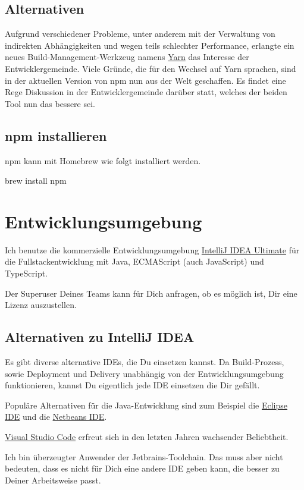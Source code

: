 \documentclass[]{article}
\begin{document}
\subsection{Alternativen}
Aufgrund verschiedener Probleme, unter anderem mit der Verwaltung von indirekten Abhängigkeiten und wegen teils schlechter Performance, erlangte ein neues Build-Management-Werkzeug namens \href{https://yarnpkg.com}{Yarn} das Interesse der Entwicklergemeinde. Viele Gründe, die für den Wechsel auf Yarn sprachen, sind in der aktuellen Version von npm nun aus der Welt geschaffen. Es findet eine Rege Diskussion in der Entwicklergemeinde darüber statt, welches der beiden Tool nun das bessere sei.

\subsection{npm installieren}
npm kann mit Homebrew wie folgt installiert werden.
\begin{bashcode}
brew install npm
\end{bashcode}

\section{Entwicklungsumgebung}
Ich benutze die kommerzielle Entwicklungsumgebung \href{https://www.jetbrains.com/idea/}{IntelliJ IDEA Ultimate} für die Fullstackentwicklung mit Java, ECMAScript (auch JavaScript) und TypeScript. 

Der Superuser Deines Teams kann für Dich anfragen, ob es möglich ist, Dir eine Lizenz auszustellen.

\subsection{Alternativen zu IntelliJ IDEA}
Es gibt diverse alternative IDEs, die Du einsetzen kannst. Da Build-Prozess, sowie Deployment und Delivery unabhängig von der Entwicklungsumgebung funktionieren, kannst Du eigentlich jede IDE einsetzen die Dir gefällt.

Populäre Alternativen für die Java-Entwicklung sind zum Beispiel die \href{https://www.eclipse.org/ide/}{Eclipse IDE} und die \href{https://netbeans.org/}{Netbeans IDE}.

\href{https://code.visualstudio.com/}{Visual Studio Code} erfreut sich in den letzten Jahren wachsender Beliebtheit.

Ich bin überzeugter Anwender der Jetbrains-Toolchain. Das muss aber nicht bedeuten, dass es nicht für Dich eine andere IDE geben kann, die besser zu Deiner Arbeitsweise passt.
\end{document}
